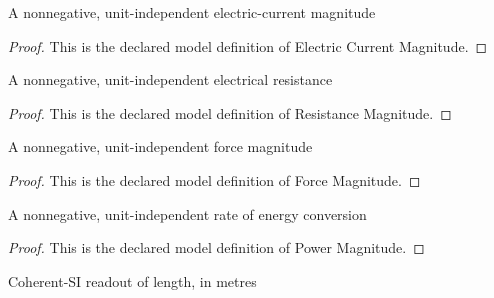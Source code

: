 \begin{definition}
  \label{def:physics:phyx-mini-0981:phyxminiproblems-problemphyxmini0981-electriccurrentmagnitude}
  A nonnegative, unit-independent electric-current magnitude
\end{definition}
\begin{proof}
  This is the declared model definition of Electric Current Magnitude.
\end{proof}
\begin{definition}
  \label{def:physics:phyx-mini-0981:phyxminiproblems-problemphyxmini0981-resistancemagnitude}
  A nonnegative, unit-independent electrical resistance
\end{definition}
\begin{proof}
  This is the declared model definition of Resistance Magnitude.
\end{proof}
\begin{definition}
  \label{def:physics:phyx-mini-0981:phyxminiproblems-problemphyxmini0981-forcemagnitude}
  A nonnegative, unit-independent force magnitude
\end{definition}
\begin{proof}
  This is the declared model definition of Force Magnitude.
\end{proof}
\begin{definition}
  \label{def:physics:phyx-mini-0981:phyxminiproblems-problemphyxmini0981-powermagnitude}
  A nonnegative, unit-independent rate of energy conversion
\end{definition}
\begin{proof}
  This is the declared model definition of Power Magnitude.
\end{proof}
\begin{definition}
  \label{def:physics:phyx-mini-0981:phyxminiproblems-problemphyxmini0981-lengthinmeters}
  Coherent-SI readout of length, in metres
\end{definition}
